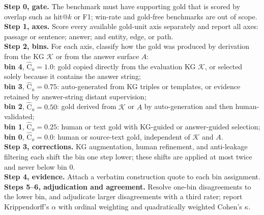 \documentclass[11pt]{article}
\newcommand{\Chat}{\widehat{\mathrm{C}}}
\newcommand{\kg}{\mathcal{K}}
\begin{document}
\begin{tcolorbox}[breakable, label=box:rubric, title=\textbf{Provenance-circularity scoring rubric, applied per gold-unit axis},
  colback=gray!3, colframe=gray!55, colbacktitle=black!75, coltitle=white, fonttitle=\small\bfseries, boxrule=0.6pt]
\footnotesize
\textbf{Step 0, gate.} The benchmark must have supporting gold that is scored by overlap such as hit@$k$ or F1; win-rate and gold-free benchmarks are out of scope.\\
\textbf{Step 1, axes.} Score every available gold-unit axis separately and report all axes: passage or sentence; answer; and entity, edge, or path.\\
\textbf{Step 2, bins.} For each axis, classify how the gold was produced by derivation from the KG $\kg$ or from the answer surface $A$:\\
\hspace*{1em}\textbf{bin 4}, $\Chat_a{=}1.0$: gold copied directly from the evaluation KG $\kg$, or selected solely because it contains the answer string;\\
\hspace*{1em}\textbf{bin 3}, $\Chat_a{=}0.75$: auto-generated from KG triples or templates, or evidence retained by answer-string distant supervision;\\
\hspace*{1em}\textbf{bin 2}, $\Chat_a{=}0.50$: gold derived from $\kg$ or $A$ by auto-generation and then human-validated;\\
\hspace*{1em}\textbf{bin 1}, $\Chat_a{=}0.25$: human or text gold with KG-guided or answer-guided selection;\\
\hspace*{1em}\textbf{bin 0}, $\Chat_a{=}0.0$: human or source-text gold, independent of $\kg$ and $A$.\\
\textbf{Step 3, corrections.} KG augmentation, human refinement, and anti-leakage filtering each shift the bin one step lower; these shifts are applied at most twice and never below bin 0.\\
\textbf{Step 4, evidence.} Attach a verbatim construction quote to each bin assignment.\\
\textbf{Steps 5--6, adjudication and agreement.} Resolve one-bin disagreements to the lower bin, and adjudicate larger disagreements with a third rater; report Krippendorff's $\alpha$ with ordinal weighting and quadratically weighted Cohen's $\kappa$.
\end{tcolorbox}
\end{document}
